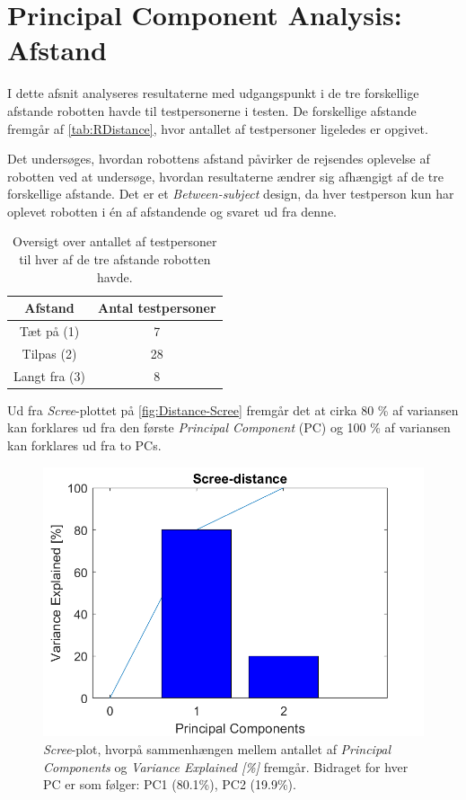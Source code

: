 \section{Principal Component Analysis: Afstand}
\label{DatabehandlingRAfstand}
%
I dette afsnit analyseres resultaterne med udgangspunkt i de tre forskellige afstande robotten havde til testpersonerne i testen. De forskellige afstande fremgår af \autoref{tab:RDistance}, hvor antallet af testpersoner ligeledes er opgivet. 

Det undersøges, hvordan robottens afstand påvirker de rejsendes oplevelse af robotten ved at undersøge, hvordan resultaterne ændrer sig afhængigt af de tre forskellige afstande. Det er et \textit{Between-subject} design, da hver testperson kun har oplevet robotten i én af afstandende og svaret ud fra denne.
%
\begin{table}[H]
\centering
\begin{tabular}{c|c}
Afstand & Antal testpersoner \\ \hline
Tæt på (1) & 7    \\ \hline
Tilpas (2) & 28    \\ \hline
Langt fra (3) & 8     \\ 
\end{tabular}
\caption{Oversigt over antallet af testpersoner til hver af de tre afstande robotten havde.}
\label{tab:RDistance}
\end{table}
\noindent
%
Ud fra \textit{Scree}-plottet på \autoref{fig:Distance-Scree} fremgår det at cirka 80 \% af variansen kan forklares ud fra den første \textit{Principal Component} (PC) og 100 \% af variansen kan forklares ud fra to PCs. 
%
\begin{figure}[H]
\centering
\includegraphics[width=\textwidth]{Figure/DatabehandlingSkalaer/PCAfigures/Distance-Scree.png}
\caption{\textit{Scree}-plot, hvorpå sammenhængen mellem antallet af \textit{Principal Components} og \textit{Variance Explained [\%]} fremgår. Bidraget for hver PC er som følger: PC1 (80.1\%), PC2 (19.9\%).}
\label{fig:Distance-Scree}
\end{figure}
